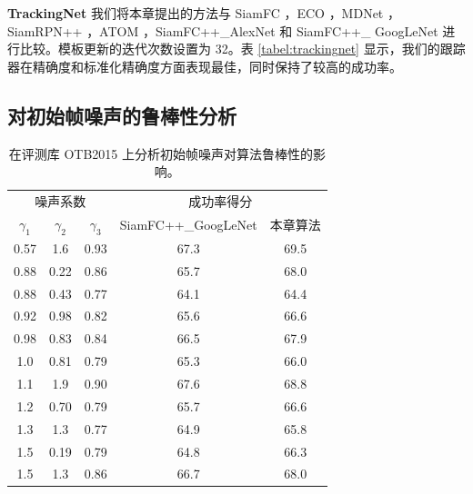 \textbf{TrackingNet} 我们将本章提出的方法与 SiamFC \cite{SiamFC}，ECO \cite{danelljan2017eco}，MDNet \cite{MDNet}，SiamRPN++ \cite{SiamRPN++}，ATOM \cite{danelljan2019atom}，SiamFC++\_AlexNet \cite{SiamFC++} 和 SiamFC++\_
GoogLeNet \cite{SiamFC++} 进行比较。模板更新的迭代次数设置为 32。表 \ref{tabel:trackingnet} 显示，我们的跟踪器在精确度和标准化精确度方面表现最佳，同时保持了较高的成功率。

\subsection{对初始帧噪声的鲁棒性分析}

\begin{table}[t]
\centering
\caption{在评测库 OTB2015 上分析初始帧噪声对算法鲁棒性的影响。}
\begin{tabular}{c c c c c}
\toprule
\multicolumn{3}{c}{噪声系数} & \multicolumn{2}{c}{成功率得分} \\
\cmidrule(lr){1-3} \cmidrule(lr){4-5}
$\gamma_1$ & $\gamma_2$ & $\gamma_3$  & SiamFC++\_GoogLeNet \cite{SiamFC++} & 本章算法  \\
\midrule
0.57  &	1.6	 & 0.93	& 67.3    & 69.5 \\
0.88  & 0.22 & 0.86 & 65.7    & 68.0 \\
0.88  & 0.43 & 0.77 & 64.1    & 64.4 \\
0.92  & 0.98 & 0.82 & 65.6    & 66.6 \\
0.98  & 0.83 & 0.84 & 66.5    & 67.9 \\
1.0   & 0.81 & 0.79 & 65.3    & 66.0 \\
1.1   &	1.9  & 0.90	& 67.6    & 68.8 \\
1.2   & 0.70 & 0.79 & 65.7    & 66.6 \\
1.3   & 1.3  & 0.77 & 64.9    & 65.8 \\
1.5   & 0.19 & 0.79 & 64.8    & 66.3 \\
1.5   & 1.3  & 0.86 & 66.7    & 68.0 \\
\bottomrule
\end{tabular}
\label{table:noise}
\end{table}

